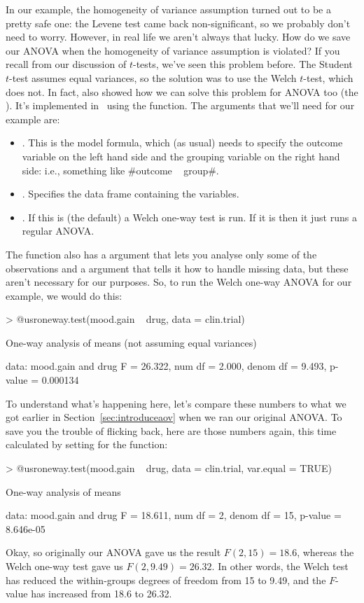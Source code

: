 In our example, the homogeneity of variance assumption turned out to be a pretty safe one: the Levene test came back non-significant, so we probably don't need to worry. However, in real life we aren't always that lucky. How do we save our ANOVA when the homogeneity of variance assumption is violated? If you recall from our discussion of $t$-tests, we've seen this problem before. The Student $t$-test assumes equal variances, so the solution was to use the Welch $t$-test, which does not. In fact,  also showed how we can solve this problem for ANOVA too (the ). It's implemented in \R\ using the  function. The arguments that we'll need for our example are:
\begin{itemize}
\item {}. This is the model formula, which (as usual) needs to specify the outcome variable on the left hand side and the grouping variable on the right hand side: i.e., something like \rtextverb#outcome ~ group#.
\item {}. Specifies the data frame containing the variables. 
\item {}. If this is  (the default) a Welch one-way test is run. If it is  then it just runs a regular ANOVA. 
\end{itemize}
The function also has a  argument that lets you analyse only some of the observations and a  argument that tells it how to handle missing data, but these aren't necessary for our purposes. So, to run the Welch one-way ANOVA for our example, we would do this:

\begin{rblock1}
> @usr{oneway.test(mood.gain ~ drug, data = clin.trial)}

	One-way analysis of means (not assuming equal variances)

data:  mood.gain and drug 
F = 26.322, num df = 2.000, denom df = 9.493, p-value = 0.000134
\end{rblock1}

\noindent
To understand what's happening here, let's compare these numbers to what we got earlier in Section~\ref{sec:introduceaov} when we ran our original ANOVA. To save you the trouble of flicking back, here are those numbers again, this time calculated by setting  for the  function:
\begin{rblock1}
> @usr{oneway.test(mood.gain ~ drug, data = clin.trial, var.equal = TRUE)}

	One-way analysis of means

data:  mood.gain and drug 
F = 18.611, num df = 2, denom df = 15, p-value = 8.646e-05
\end{rblock1}
Okay, so originally our ANOVA gave us the result $F(2,15) = 18.6$, whereas the Welch one-way test gave us $F(2,9.49) = 26.32$. In other words, the Welch test has reduced the within-groups degrees of freedom from 15 to 9.49, and the $F$-value has increased from 18.6 to 26.32. 


